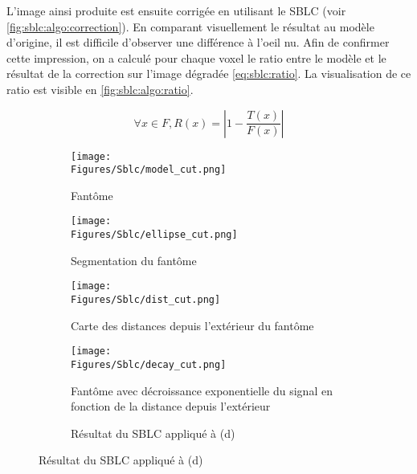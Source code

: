 \documentclass[\main/main.tex]{subfiles}
\begin{document}
%
L'image ainsi produite est ensuite corrigée en utilisant le SBLC (voir \autoref{fig:sblc:algo:correction}).
%
En comparant visuellement le résultat au modèle d'origine, il est difficile d'observer une différence à l'oeil nu.
%
Afin de confirmer cette impression, on a calculé pour chaque voxel le ratio entre le modèle et le résultat de la correction sur l'image dégradée \eqref{eq:sblc:ratio}.
%
La visualisation de ce ratio est visible en \autoref{fig:sblc:algo:ratio}.

\begin{equation}
    \label{eq:sblc:ratio}
    \forall x \in F, R(x) = \left| 1 - \frac{T(x)}{F(x)} \right|
\end{equation}

\begin{figure}[h!]

    \centering
    \begin{subfigure}[b]{0.30\textwidth}
       \caption{
        \centering
            \label{fig:sblc:algo:model}
            Fantôme
            }
       \centering \texttt{[image: \\Figures/Sblc/model\_cut.png]}
    \end{subfigure}
    \begin{subfigure}[b]{0.30\textwidth}
       \caption{
        \centering
            \label{fig:sblc:algo:ellipse}
            Segmentation du fantôme
            }
       \centering \texttt{[image: \\Figures/Sblc/ellipse\_cut.png]}
    \end{subfigure}
    \begin{subfigure}[b]{0.30\textwidth}
       \caption{
        \centering
            \label{fig:sblc:algo:dist}
            Carte des distances depuis l'extérieur du fantôme
            }
       \centering \texttt{[image: \\Figures/Sblc/dist\_cut.png]}
    \end{subfigure}
    \begin{subfigure}[b]{0.30\textwidth}
       \caption{
        \centering
            \label{fig:sblc:algo:decay}
            Fantôme avec décroissance exponentielle du signal en fonction de la distance depuis l'extérieur
            }
       \centering \texttt{[image: \\Figures/Sblc/decay\_cut.png]}
    \end{subfigure}
    \begin{subfigure}[b]{0.30\textwidth}
       \caption{
        \centering
            \label{fig:sblc:algo:correction}
            Résultat du SBLC appliqué à (d)
            }

\end{subfigure}
\end{figure}
\end{document}
